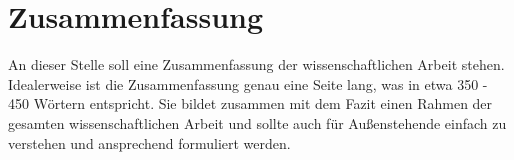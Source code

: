 \chapter*{Zusammenfassung}

An dieser Stelle soll eine Zusammenfassung der wissenschaftlichen Arbeit stehen. Idealerweise ist die Zusammenfassung genau eine Seite lang, was in etwa 350 - 450 Wörtern entspricht. Sie bildet zusammen mit dem Fazit einen Rahmen der gesamten wissenschaftlichen Arbeit und sollte auch für Außenstehende einfach zu verstehen und ansprechend formuliert werden.